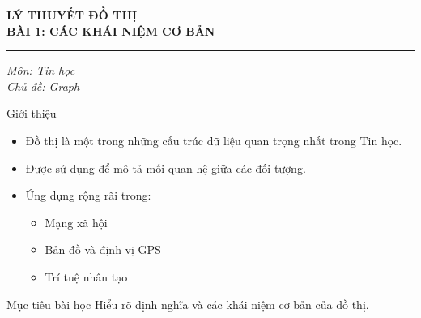 \documentclass[aspectratio=169]{beamer}
\title{}
\author{}
\date{}
\begin{document}
\begin{frame}

\vspace{2.5cm}

\begin{center}
{\Huge \textbf{LÝ THUYẾT ĐỒ THỊ}}\\[0.8cm]

{\LARGE \textbf{BÀI 1: CÁC KHÁI NIỆM CƠ BẢN}}\\[0.5cm]

\rule{9cm}{1.2pt}
\end{center}

\vfill
\begin{flushright}
\textit{Môn: Tin học}\\
\textit{Chủ đề: Graph}
\end{flushright}

\end{frame}

\begin{frame}{Giới thiệu}
\begin{itemize}
    \item Đồ thị là một trong những cấu trúc dữ liệu quan trọng nhất trong Tin học.
    \item Được sử dụng để mô tả mối quan hệ giữa các đối tượng.
    \item Ứng dụng rộng rãi trong:
    \begin{itemize}
        \item Mạng xã hội
        \item Bản đồ và định vị GPS
        \item Trí tuệ nhân tạo
    \end{itemize}
\end{itemize}

\begin{block}{Mục tiêu bài học}
Hiểu rõ định nghĩa và các khái niệm cơ bản của đồ thị.
\end{block}
\end{frame}
\end{document}
